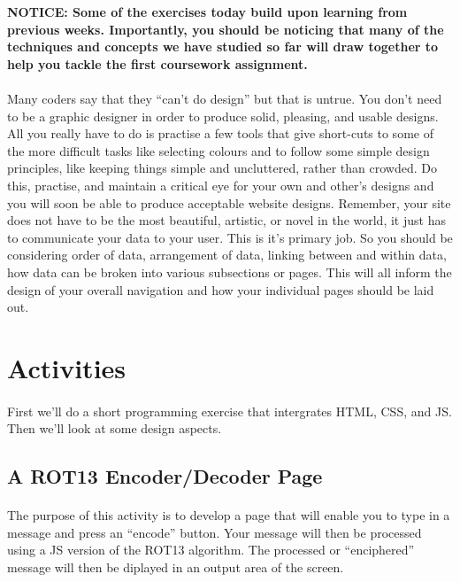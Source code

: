 \documentclass[10pt, a4paper, twosize]{article}
\begin{document}
\begin{framed}
{\bf{NOTICE:}  Some of the exercises today build upon learning from previous weeks. Importantly, you should be noticing that many of the techniques and concepts we have studied so far will draw together to help you tackle the first coursework assignment.}
\end{framed}


\paragraph{} Many coders say that they ``can't do design'' but that is untrue. You don't need to be a graphic designer in order to produce solid, pleasing, and usable designs. All you really have to do is practise a few tools that give short-cuts to some of the more difficult tasks like selecting colours and to follow some simple design principles, like keeping things simple and uncluttered, rather than crowded. Do this, practise, and maintain a critical eye for your own and other's designs and you will soon be able to produce acceptable website designs. Remember, your site does not have to be the most beautiful, artistic, or novel in the world, it just has to communicate your data to your user. This is it's primary job. So you should be considering order of data, arrangement of data, linking between and within data, how data can be broken into various subsections or pages. This will all inform the design of your overall navigation and how your individual pages should be laid out. 

\section{Activities}

\paragraph{} First we'll do a short programming exercise that intergrates HTML, CSS, and JS. Then we'll look at some design aspects.

\subsection{A ROT13 Encoder/Decoder Page}
\paragraph{} The purpose of this activity is to develop a page that will enable you to type in a message and press an ``encode'' button. Your message will then be processed using a JS version of the ROT13 algorithm. The processed or ``enciphered'' message will then be diplayed in an output area of the screen. 
\end{document}
